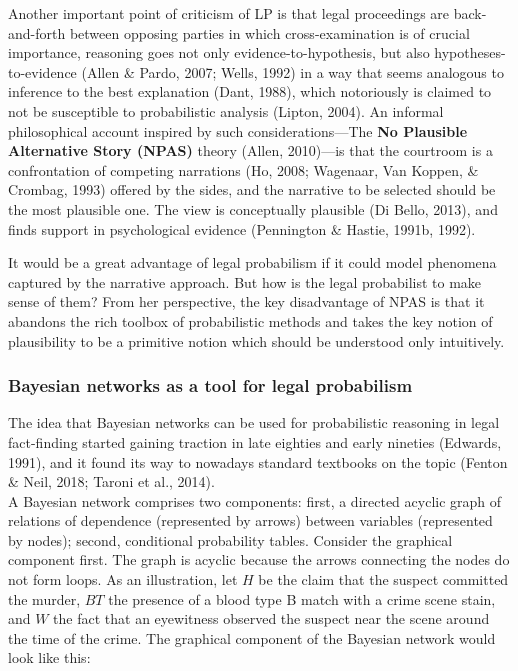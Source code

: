 \documentclass[11pt,dvipsnames,enabledeprecatedfontcommands]{scrartcl}
\begin{document}
Another important point of criticism of LP is that legal proceedings are
back-and-forth between opposing parties in which cross-examination is of
crucial importance, reasoning goes not only evidence-to-hypothesis, but
also hypotheses-to-evidence (Allen \& Pardo, 2007; Wells, 1992) in a way
that seems analogous to inference to the best explanation (Dant, 1988),
which notoriously is claimed to not be susceptible to probabilistic
analysis (Lipton, 2004). An informal philosophical account inspired by
such considerations---The \textbf{No Plausible Alternative Story (NPAS)}
theory (Allen, 2010)---is that the courtroom is a confrontation of
competing narrations (Ho, 2008; Wagenaar, Van Koppen, \& Crombag, 1993)
offered by the sides, and the narrative to be selected should be the
most plausible one. The view is conceptually plausible (Di Bello, 2013),
and finds support in psychological evidence (Pennington \& Hastie,
1991b, 1992).

It would be a great advantage of legal probabilism if it could model
phenomena captured by the narrative approach. But how is the legal
probabilist to make sense of them? From her perspective, the key
disadvantage of NPAS is that it abandons the rich toolbox of
probabilistic methods and takes the key notion of plausibility to be a
primitive notion which should be understood only intuitively.

\subsubsection{Bayesian networks as a tool for legal
probabilism}\label{bayesian-networks-as-a-tool-for-legal-probabilism}

The idea that Bayesian networks can be used for probabilistic reasoning
in legal fact-finding started gaining traction in late eighties and
early nineties (Edwards, 1991), and it found its way to nowadays
standard textbooks on the topic (Fenton \& Neil, 2018; Taroni et al.,
2014).\\
A Bayesian network comprises two components: first, a directed acyclic
graph of relations of dependence (represented by arrows) between
variables (represented by nodes); second, conditional probability
tables. Consider the graphical component first. The graph is acyclic
because the arrows connecting the nodes do not form loops. As an
illustration, let \(H\) be the claim that the suspect committed the
murder, \(BT\) the presence of a blood type B match with a crime scene
stain, and \(W\) the fact that an eyewitness observed the suspect near
the scene around the time of the crime. The graphical component of the
Bayesian network would look like this:
\end{document}
